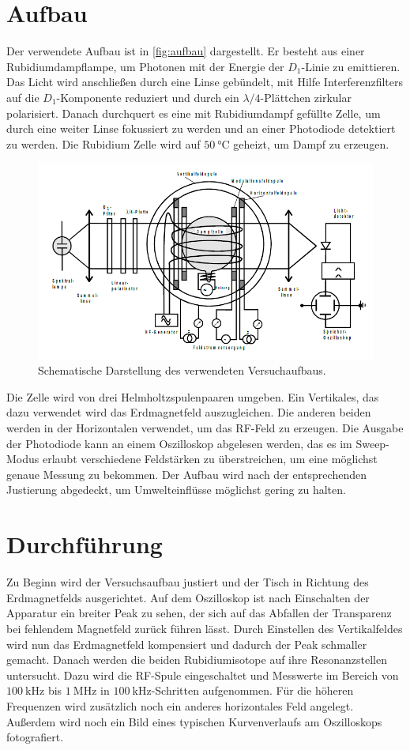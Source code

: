 \section{Aufbau}
\label{sec:Aufbau}
Der verwendete Aufbau ist in \autoref{fig:aufbau} dargestellt. Er besteht aus einer Rubidiumdampflampe, um Photonen
mit der Energie der $D_1$-Linie zu emittieren. Das Licht wird anschließen durch eine Linse gebündelt, mit Hilfe
Interferenzfilters auf die $D_1$-Komponente reduziert und durch ein $\lambda/4$-Plättchen zirkular polarisiert.
Danach durchquert es eine mit Rubidiumdampf gefüllte Zelle, um durch eine weiter Linse fokussiert zu werden und
an einer Photodiode detektiert zu werden. Die Rubidium Zelle wird auf $\SI{50}{\celsius}$ geheizt, um Dampf zu
erzeugen.
\begin{figure}
    \centering
    \includegraphics[scale=0.8]{aufbau.png}
    \caption{Schematische Darstellung des verwendeten Versuchaufbaus. \cite{V21}}
    \label{fig:aufbau}
\end{figure}
Die Zelle wird von drei Helmholtzspulenpaaren umgeben. Ein Vertikales, das dazu verwendet wird das Erdmagnetfeld
auszugleichen. Die anderen beiden werden in der Horizontalen verwendet, um das RF-Feld
zu erzeugen. Die Ausgabe der Photodiode kann an einem Oszilloskop abgelesen werden, das es im Sweep-Modus erlaubt
verschiedene Feldstärken zu überstreichen, um eine möglichst genaue Messung zu bekommen. Der Aufbau wird nach der
entsprechenden Justierung abgedeckt, um Umwelteinflüsse möglichst gering zu halten.

\section{Durchführung}
\label{sec:Durchführung}
Zu Beginn wird der Versuchsaufbau justiert und der Tisch in Richtung des Erdmagnetfelds ausgerichtet. Auf dem
Oszilloskop ist nach Einschalten der Apparatur ein breiter Peak zu sehen, der sich auf das Abfallen der
Transparenz bei fehlendem Magnetfeld zurück führen lässt. Durch Einstellen des Vertikalfeldes wird nun das
Erdmagnetfeld kompensiert und dadurch der Peak schmaller gemacht. Danach werden die beiden Rubidiumisotope auf
ihre Resonanzstellen untersucht. Dazu wird die RF-Spule eingeschaltet und Messwerte im Bereich von
$\SI{100}{\kilo\hertz}$ bis $\SI{1}{\mega\hertz}$ in $\SI{100}{\kilo\hertz}$-Schritten aufgenommen. Für die
höheren Frequenzen wird zusätzlich noch ein anderes horizontales Feld angelegt. Außerdem wird noch ein Bild eines
typischen Kurvenverlaufs am Oszilloskops fotografiert.